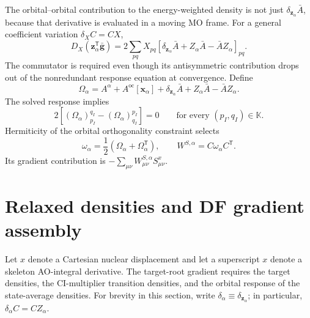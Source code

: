 \documentclass[aip,preprint,nofootinbib]{revtex4-1}
\begin{document}
The orbital--orbital contribution to the energy-weighted density is not just
$\delta_{\mathbf z_\alpha}\bar A$, because that derivative is evaluated in a
moving MO frame.  For a general coefficient variation
$\delta_XC=CX$,
\begin{equation}
 D_X\left(\mathbf z_\alpha^{\mathsf T}\bar{\mathbf g}\right)
 =2\sum_{pq}X_{pq}
 \left[\delta_{\mathbf z_\alpha}\bar A
 +Z_\alpha\bar A-\bar A Z_\alpha\right]_{pq}.
 \label{eq:nr-full-coefficient-derivative}
\end{equation}
The commutator is required even though its antisymmetric contribution drops
out of the nonredundant response equation at convergence.  Define
\begin{equation}
 \boxed{
 \Omega_\alpha=A^\alpha
 +A^{\mathrm{oc}}[\mathbf x_\alpha]
 +\delta_{\mathbf z_\alpha}\bar A
 +Z_\alpha\bar A-\bar A Z_\alpha
 }.
 \label{eq:nr-relaxed-lagrangian}
\end{equation}
The solved response implies
\begin{equation}
 2\left[(\Omega_\alpha)^{q_I}_{p_I}
       -(\Omega_\alpha)^{p_I}_{q_I}\right]=0
 \qquad\text{for every }(p_I,q_I)\in\mathbb K.
\end{equation}
Hermiticity of the orbital orthogonality constraint selects
\begin{equation}
 \boxed{
 \omega_\alpha=\frac12
 (\Omega_\alpha+\Omega_\alpha^{\mathsf T})
 },
 \qquad
 W^{S,\alpha}=C\omega_\alpha C^{\mathsf T}.
 \label{eq:nr-omega}
\end{equation}
Its gradient contribution is
$-\sum_{\mu\nu}W^{S,\alpha}_{\mu\nu}S^x_{\mu\nu}$.

\section{Relaxed densities and DF gradient assembly}
\label{sec:nr-gradient}

Let $x$ denote a Cartesian nuclear displacement and let a superscript $x$
denote a skeleton AO-integral derivative.  The target-root gradient requires
the target densities, the CI-multiplier transition densities, and the orbital
response of the state-average densities.
For brevity in this section, write
$\delta_\alpha\equiv\delta_{\mathbf z_\alpha}$; in particular,
$\delta_\alpha C=CZ_\alpha$.
\end{document}
